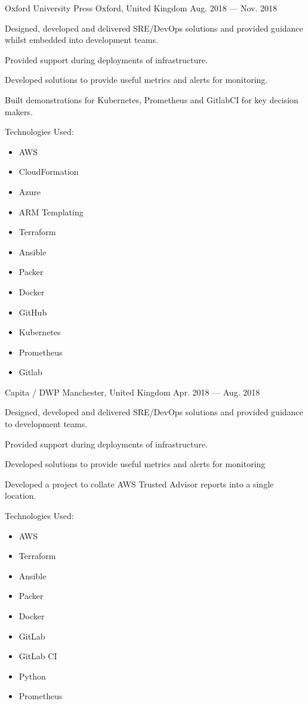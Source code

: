 \begin{cventries}
	{Oxford University Press}
	{Oxford, United Kingdom}
	{Aug. 2018 — Nov. 2018}
	{
		\begin{cvitems}
			\item{Designed, developed and delivered SRE/DevOps solutions and provided guidance whilst embedded into development teams.}
			\item{Provided support during deployments of infrastructure.}
			\item{Developed solutions to provide useful metrics and alerts for monitoring.}
			\item{Built demonstrations for Kubernetes, Prometheus and GitlabCI for key decision makers.}
			\item{Technologies Used:}
				\begin{itemize}
					\item AWS
					\item CloudFormation
					\item Azure
					\item ARM Templating
					\item Terraform
					\item Ansible
					\item Packer
					\item Docker
					\item GitHub
					\item Kubernetes
					\item Prometheus
					\item Gitlab
				\end{itemize}
		\end{cvitems}
	}
	
	{Capita / DWP}
	{Manchester, United Kingdom}
	{Apr. 2018 — Aug. 2018}
	{
		\begin{cvitems}
			\item{Designed, developed and delivered SRE/DevOps solutions and provided guidance to development teams.}
			\item{Provided support during deployments of infrastructure.}
			\item{Developed solutions to provide useful metrics and alerts for monitoring}
			\item{Developed a project to collate AWS Trusted Advisor reports into a single location.}
			\item{Technologies Used:}
				\begin{itemize}
					\item AWS
					\item Terraform
					\item Ansible
					\item Packer
					\item Docker
					\item GitLab
					\item GitLab CI
					\item Python
					\item Prometheus
				\end{itemize}
		\end{cvitems}
	}


\end{cventries}
